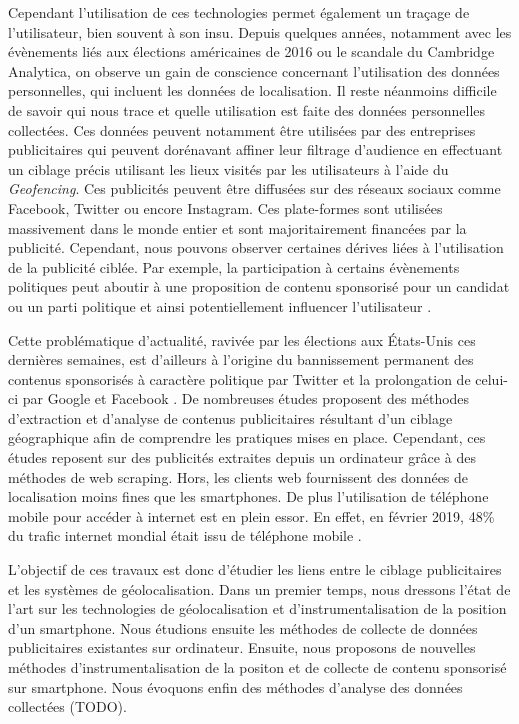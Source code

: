 \documentclass[runningheads]{llncs}
\begin{document}
Cependant l'utilisation de ces technologies permet également un traçage de l'utilisateur, bien souvent à son insu. Depuis quelques années, notamment avec les évènements liés aux élections américaines de 2016\cite{robert_mueller_report_2019} ou le scandale du Cambridge Analytica, on observe un gain de conscience concernant l'utilisation des données personnelles, qui incluent les données de localisation. Il reste néanmoins difficile de savoir qui nous trace et quelle utilisation est faite des données personnelles collectées. Ces données peuvent notamment être utilisées par des entreprises publicitaires qui peuvent dorénavant affiner leur filtrage d'audience en effectuant un ciblage précis utilisant les lieux visités par les utilisateurs à l'aide du \textit{Geofencing}\cite{google_geofencing_2020}. Ces publicités peuvent être diffusées sur des réseaux sociaux comme Facebook\cite{facebook_for_buisness_a_2020}, Twitter\cite{twitter_geo_2020} ou encore Instagram. Ces plate-formes sont utilisées massivement dans le monde entier et sont majoritairement financées par la publicité. Cependant, nous pouvons observer certaines dérives liées à l'utilisation de la publicité ciblée. Par exemple, la participation à certains évènements politiques peut aboutir à une proposition de contenu sponsorisé pour un candidat ou un parti politique et ainsi potentiellement influencer l'utilisateur \cite{bradshaw_challenging_nodate}.

Cette problématique d'actualité, ravivée par les élections aux États-Unis ces dernières semaines, est d'ailleurs à l'origine du bannissement permanent des contenus sponsorisés à caractère politique par Twitter et la prolongation de celui-ci par Google et Facebook \cite{facebook_facebook_2020}. De nombreuses études proposent des méthodes d'extraction et d'analyse de contenus publicitaires résultant d'un ciblage géographique afin de comprendre les pratiques mises en place. Cependant, ces études reposent sur des publicités extraites depuis un ordinateur grâce à des méthodes de web scraping. Hors, les clients web fournissent des données de localisation moins fines que les smartphones. De plus l'utilisation de téléphone mobile pour accéder à internet est en plein essor. En effet, en février 2019, 48\% du trafic internet mondial était issu de téléphone mobile \cite{cycles_topic_nodate}.

L'objectif de ces travaux est donc d'étudier les liens entre le ciblage publicitaires et les systèmes de géolocalisation. Dans un premier temps, nous dressons l'état de l'art sur les technologies de géolocalisation et d'instrumentalisation de la position d'un smartphone. Nous étudions ensuite les méthodes de collecte de données publicitaires existantes sur ordinateur. Ensuite, nous proposons de nouvelles méthodes d'instrumentalisation de la positon et de collecte de contenu sponsorisé sur smartphone. Nous évoquons enfin des méthodes d'analyse des données collectées (TODO).
\end{document}
